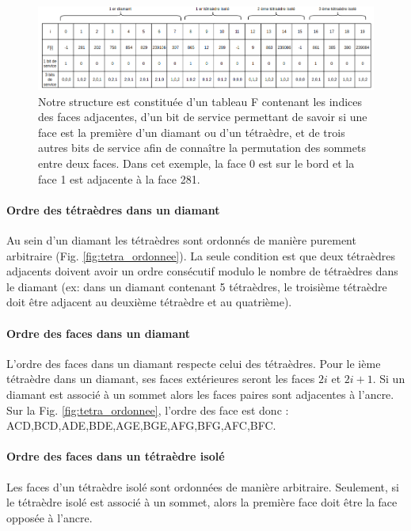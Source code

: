 \documentclass[a4paper,11pt,openany]{article}
\begin{document}
\begin{figure}[H]
\begin{center}
\includegraphics[scale=0.45]{Images/structure}
\caption{Notre structure est constituée d'un tableau F contenant les indices des faces adjacentes, d'un bit de service permettant de savoir si une face est la première d'un diamant ou d'un tétraèdre, et de trois autres bits de service afin de connaître la permutation des sommets entre deux faces. Dans cet exemple, la face 0 est sur le bord et la face 1 est adjacente à la face 281.}
\label{fig:structure}
\end{center}
\end{figure}

\paragraph{Ordre des tétraèdres dans un diamant}
Au sein d'un diamant les tétraèdres sont ordonnés de manière purement arbitraire (Fig. \ref{fig:tetra_ordonnee}). La seule condition est que deux tétraèdres adjacents doivent avoir un ordre consécutif modulo le nombre de tétraèdres dans le diamant (ex: dans un diamant contenant 5 tétraèdres, le troisième tétraèdre doit être adjacent au deuxième tétraèdre et au quatrième).
\paragraph{Ordre des faces dans un diamant}
L'ordre des faces dans un diamant respecte celui des tétraèdres. Pour le ième tétraèdre dans un diamant, ses faces extérieures seront les faces $2i$ et $2i+1$. Si un diamant est associé à un sommet alors les faces paires sont adjacentes à l'ancre. Sur la Fig. \ref{fig:tetra_ordonnee}, l'ordre des face est donc : ACD,BCD,ADE,BDE,AGE,BGE,AFG,BFG,AFC,BFC.
\paragraph{Ordre des faces dans un tétraèdre isolé}
Les faces d'un tétraèdre isolé sont ordonnées de manière arbitraire. Seulement, si le tétraèdre isolé est associé à un sommet, alors la première face doit être la face opposée à l'ancre.
\end{document}
